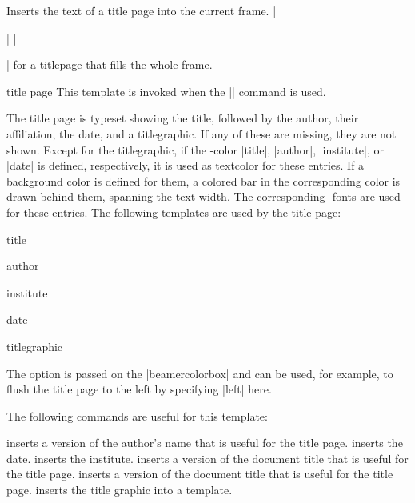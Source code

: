 \begin{command}{\titlepage}
  Inserts the text of a title page into the current frame.
  \example
  |\begin{frame}\titlepage\end{frame}|
  \example
  |\begin{frame}[plain]\titlepage\end{frame}| for a titlepage that fills the whole frame.

  \begin{element}{title page}\yes\yes\yes
    This template is invoked when the |\titlepage| command is used.

    \begin{templateoptions}
      The title page is typeset showing the title, followed by the author, their affiliation, the date, and a titlegraphic. If any of these are missing, they are not shown. Except for the titlegraphic, if the \beamer-color |title|, |author|, |institute|, or |date| is defined, respectively, it is used as textcolor for these entries. If a background color is defined for them, a colored bar in the corresponding color is drawn behind them, spanning the text width. The corresponding \beamer-fonts are used for these entries. The following templates are used by the title page:
      \begin{element}{title}\yes\yes\yes
      \end{element}
      \begin{element}{author}\yes\yes\yes
      \end{element}
      \begin{element}{institute}\yes\yes\yes
      \end{element}
      \begin{element}{date}\yes\yes\yes
      \end{element}
      \begin{element}{titlegraphic}\yes\no\no
      \end{element}      
      
      The  option is passed on the |beamercolorbox| and can be used, for example, to flush the title page to the left by specifying |left| here.
    \end{templateoptions}

    The following commands are useful for this template:
    \begin{templateinserts}
      \iteminsert{\insertauthor} inserts a version of the author's name that is useful for the title page.
      \iteminsert{\insertdate} inserts the date.
      \iteminsert{\insertinstitute} inserts the institute.
      \iteminsert{\inserttitle} inserts a version of the document title that is useful for the title page.
      \iteminsert{\insertsubtitle} inserts a version of the document title that is useful for the title page.
      \iteminsert{\inserttitlegraphic} inserts the title graphic into a template.
    \end{templateinserts}
  \end{element}
\end{command}

